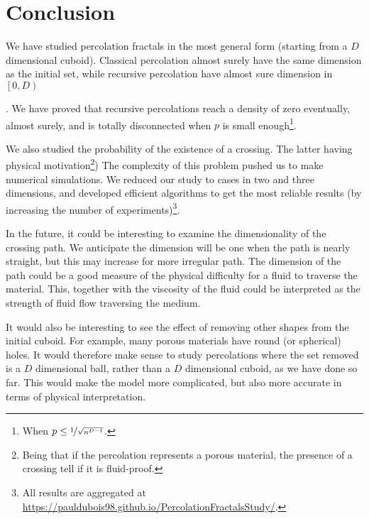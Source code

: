 \section{Conclusion}
We have studied percolation fractals in the most general form (starting from a $D$ dimensional cuboid).
Classical percolation almost surely have the same dimension as the initial set\footnotemark, while recursive percolation have almost sure dimension in $\left[ 0, D \right)$
\addtocounter{footnote}{-1}
\footnotemark
{}.
We have proved that recursive percolations reach a density of zero eventually, almost surely, and is totally disconnected when $p$ is small enough\footnote{When $p \leq \nicefrac{1}{\sqrt{n^{D-1}}}$.}.

We also studied the probability of the existence of a crossing. The latter having physical motivation\footnote{Being that if the percolation represents a porous material, the presence of a crossing tell if it is fluid-proof.})
The complexity of this problem pushed us to make numerical simulations.
We reduced our study to cases in two and three dimensions, and developed efficient algorithms to get the most reliable results (by increasing the number of experiments)\footnote{All results are aggregated at \url{https://pauldubois98.github.io/PercolationFractalsStudy/}.}.

In the future, it could be interesting to examine the dimensionality of the crossing path.
We anticipate the dimension will be one when the path is nearly straight, but this may increase for more irregular path.
The dimension of the path could be a good measure of the physical difficulty for a fluid to traverse the material.
This, together with the viscosity of the fluid could be interpreted as the strength of fluid flow traversing the medium.

It would also be interesting to see the effect of removing other shapes from the initial cuboid.
For example, many porous materials have round (or spherical) holes. It would therefore make sense to study percolations where the set removed is a $D$ dimensional ball, rather than a $D$ dimensional cuboid, as we have done so far.
This would make the model more complicated, but also more accurate in terms of physical interpretation.
